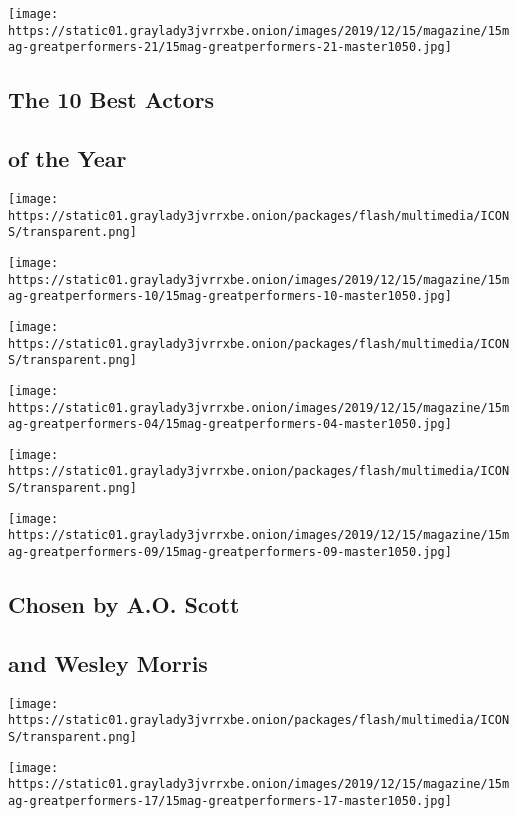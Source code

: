 \texttt{[image: https://static01.graylady3jvrrxbe.onion/images/2019/12/15/magazine/15mag-greatperformers-21/15mag-greatperformers-21-master1050.jpg]}

\hypertarget{the-10-best-actors}{%
\subsection{The 10 Best Actors}\label{the-10-best-actors}}

\hypertarget{of-the-year}{%
\subsection{of the Year}\label{of-the-year}}

\texttt{[image: https://static01.graylady3jvrrxbe.onion/packages/flash/multimedia/ICONS/transparent.png]}

\texttt{[image: https://static01.graylady3jvrrxbe.onion/images/2019/12/15/magazine/15mag-greatperformers-10/15mag-greatperformers-10-master1050.jpg]}

\texttt{[image: https://static01.graylady3jvrrxbe.onion/packages/flash/multimedia/ICONS/transparent.png]}

\texttt{[image: https://static01.graylady3jvrrxbe.onion/images/2019/12/15/magazine/15mag-greatperformers-04/15mag-greatperformers-04-master1050.jpg]}

\texttt{[image: https://static01.graylady3jvrrxbe.onion/packages/flash/multimedia/ICONS/transparent.png]}

\texttt{[image: https://static01.graylady3jvrrxbe.onion/images/2019/12/15/magazine/15mag-greatperformers-09/15mag-greatperformers-09-master1050.jpg]}

\hypertarget{chosen-by-ao-scott}{%
\subsection{Chosen by A.O. Scott}\label{chosen-by-ao-scott}}

\hypertarget{and-wesley-morris}{%
\subsection{and Wesley Morris}\label{and-wesley-morris}}

\texttt{[image: https://static01.graylady3jvrrxbe.onion/packages/flash/multimedia/ICONS/transparent.png]}

\texttt{[image: https://static01.graylady3jvrrxbe.onion/images/2019/12/15/magazine/15mag-greatperformers-17/15mag-greatperformers-17-master1050.jpg]}

